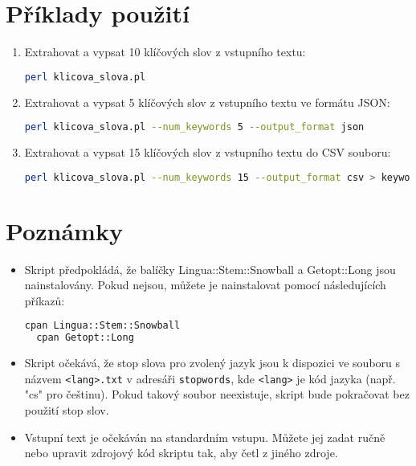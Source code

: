 \documentclass{article}
\begin{document}
\section{Příklady použití}
\begin{enumerate}
  \item Extrahovat a vypsat 10 klíčových slov z vstupního textu:
  \begin{lstlisting}[language=bash]
  perl klicova_slova.pl
  \end{lstlisting}

  \item Extrahovat a vypsat 5 klíčových slov z vstupního textu ve formátu JSON:
  \begin{lstlisting}[language=bash]
  perl klicova_slova.pl --num_keywords 5 --output_format json
  \end{lstlisting}

  \item Extrahovat a vypsat 15 klíčových slov z vstupního textu do CSV souboru:
  \begin{lstlisting}[language=bash]
  perl klicova_slova.pl --num_keywords 15 --output_format csv > keywords.csv
  \end{lstlisting}
\end{enumerate}

\section{Poznámky}
\begin{itemize}
  \item Skript předpokládá, že balíčky Lingua::Stem::Snowball a Getopt::Long jsou nainstalovány. Pokud nejsou, můžete je nainstalovat pomocí následujících příkazů:
  \begin{lstlisting}[language=bash]
  cpan Lingua::Stem::Snowball
  cpan Getopt::Long
  \end{lstlisting}

  \item Skript očekává, že stop slova pro zvolený jazyk jsou k dispozici ve souboru s názvem \texttt{<lang>.txt} v adresáři \texttt{stopwords}, kde \texttt{<lang>} je kód jazyka (např. "cs" pro češtinu). Pokud takový soubor neexistuje, skript bude pokračovat bez použití stop slov.

  \item Vstupní text je očekáván na standardním vstupu. Můžete jej zadat ručně nebo upravit zdrojový kód skriptu tak, aby četl z jiného zdroje.
\end{itemize}
\end{document}
